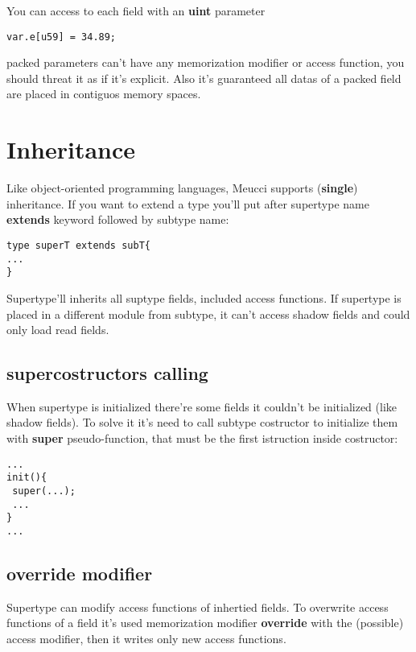 \documentclass[10pt]{book}%
\renewcommand{\emph}[1]{\textbf{#1}}
\newenvironment{codeenv}{
\begin{mdframed}[backgroundcolor=black!20,topline=false,leftline=false,rightline=false,bottomline=false]
}
{\end{mdframed}}
\begin{document}
You can access to each field with an \emph{uint} parameter
\begin{codeenv}
\begin{verbatim}
var.e[u59] = 34.89;
\end{verbatim}
\end{codeenv}

packed parameters can't have any memorization modifier or access function, you should threat it as if it's explicit. Also it's guaranteed all datas of a packed field are placed in contiguos memory spaces.

\section{Inheritance}
Like object-oriented programming languages, Meucci supports (\emph{single}) inheritance. If you want to extend a type you'll put after supertype name \emph{extends} keyword followed by subtype name:
\begin{codeenv}
\begin{verbatim}
type superT extends subT{
...
}
\end{verbatim}
\end{codeenv}
Supertype'll inherits all suptype fields, included access functions. If supertype is placed in a different module from subtype, it can't access shadow fields and could only load read fields.

\subsection{supercostructors calling}
When supertype is initialized there're some fields it couldn't be initialized (like shadow fields). To solve it it's need to call subtype costructor to initialize them with \emph{super} pseudo-function, that must be the first istruction inside costructor:
\begin{codeenv}
\begin{verbatim}
...
init(){
 super(...);
 ...
}
...
\end{verbatim}
\end{codeenv}

\subsection{override modifier}
Supertype can modify access functions of inhertied fields. To overwrite access functions of a field it's used memorization modifier \emph{override} with the (possible) access modifier, then it writes only new access functions.
\end{document}
